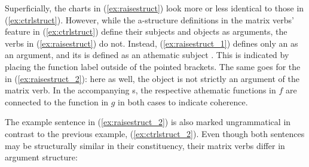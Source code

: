 Superficially, the charts in (\ref{ex:raisestruct}) look more or less identical
to those in (\ref{ex:ctrlstruct}). However, while the a-structure definitions
in the matrix verbs' \Pred{} feature in (\ref{ex:ctrlstruct}) define their
subjects and objects as arguments, the verbs in (\ref{ex:raisestruct}) do not.
Instead, (\ref{ex:raisestruct_1}) defines only an \XCompl{} as an argument, and
its \Subj{} is defined as an athematic subject \citep[304--308]{bresnan2016}.
This is indicated by placing the function label outside of the pointed
brackets. The same goes for the \Obj{} in (\ref{ex:raisestruct_2}): here as
well, the object is not strictly an argument of the matrix verb. In the
accompanying \Avm{}s, the respective athematic functions in $f$ are connected
to the \Subj{} function in $g$ in both cases to indicate coherence.

The example sentence in (\ref{ex:raisestruct_2}) is also marked ungrammatical
in contrast to the previous example, (\ref{ex:ctrlstruct_2}). Even though both
sentences may be structurally similar in their constituency, their matrix verbs
differ in argument structure:

\pex\label{ex:ctrlraisecomp}
\a\label{ex:ctrlraisecomp_octrl}%

\a\label{ex:ctrlraisecomp_raiseo}%
\xe

